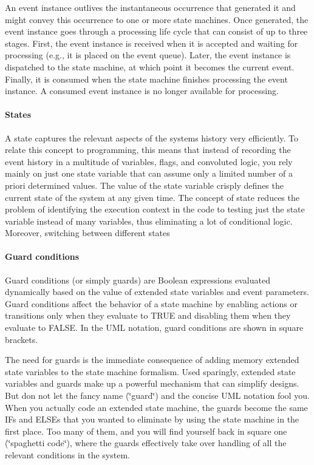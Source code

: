 An event instance outlives the instantaneous occurrence that generated it and might convey this occurrence to one or more state machines. Once generated, the event instance goes through a processing life cycle that can consist of up to three stages. First, the event instance is received when it is accepted and waiting for processing (e.\+g., it is placed on the event queue). Later, the event instance is dispatched to the state machine, at which point it becomes the current event. Finally, it is consumed when the state machine finishes processing the event instance. A consumed event instance is no longer available for processing.

\paragraph*{States}

A state captures the relevant aspects of the system\textquotesingle{}s history very efficiently. To relate this concept to programming, this means that instead of recording the event history in a multitude of variables, flags, and convoluted logic, you rely mainly on just one state variable that can assume only a limited number of a priori determined values. The value of the state variable crisply defines the current state of the system at any given time. The concept of state reduces the problem of identifying the execution context in the code to testing just the state variable instead of many variables, thus eliminating a lot of conditional logic. Moreover, switching between different states

\paragraph*{Guard conditions}

Guard conditions (or simply guards) are Boolean expressions evaluated dynamically based on the value of extended state variables and event parameters. Guard conditions affect the behavior of a state machine by enabling actions or transitions only when they evaluate to T\+R\+UE and disabling them when they evaluate to F\+A\+L\+SE. In the U\+ML notation, guard conditions are shown in square brackets.

The need for guards is the immediate consequence of adding memory extended state variables to the state machine formalism. Used sparingly, extended state variables and guards make up a powerful mechanism that can simplify designs. But don not let the fancy name (\char`\"{}guard\char`\"{}) and the concise U\+ML notation fool you. When you actually code an extended state machine, the guards become the same I\+Fs and E\+L\+S\+Es that you wanted to eliminate by using the state machine in the first place. Too many of them, and you will find yourself back in square one (\char`\"{}spaghetti code\char`\"{}), where the guards effectively take over handling of all the relevant conditions in the system.

